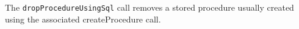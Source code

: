 The \verb+dropProcedureUsingSql+ call removes a stored procedure usually created using the associated createProcedure call.
